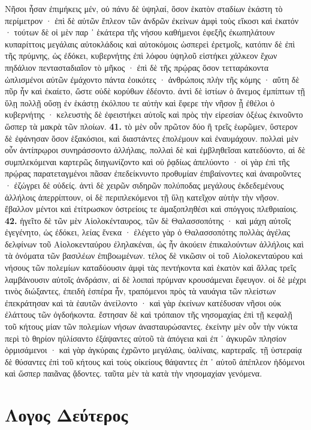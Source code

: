 \documentclass[a4paper, 11pt, oneside, polutonikogreek, german]{article}
\begin{document}
Νῆσοι ἦσαν ἐπιμήκεις μέν, οὐ πάνυ δὲ ὑψηλαί, ὅσον ἑκατὸν σταδίων ἑκάστη τὸ περίμετρον · ἐπὶ δὲ αὐτῶν ἔπλεον τῶν ἀνδρῶν ἐκείνων ἀμφὶ τοὺς εἴκοσι καὶ ἑκατόν · τούτων δὲ οἱ μὲν παρ ᾽ ἑκάτερα τῆς νήσου καθήμενοι ἐφεξῆς ἐκωπηλάτουν κυπαρίττοις μεγάλαις αὐτοκλάδοις καὶ αὐτοκόμοις ὡσπερεὶ ἐρετμοῖς, κατόπιν δὲ ἐπὶ τῆς πρύμνης, ὡς ἐδόκει, κυβερνήτης ἐπὶ λόφου ὑψηλοῦ εἱστήκει χάλκεον ἔχων πηδάλιον πεντασταδιαῖον τὸ μῆκος · ἐπὶ δὲ τῆς πρῴρας ὅσον τετταράκοντα ὡπλισμένοι αὐτῶν ἐμάχοντο πάντα ἐοικότες · ἀνθρώποις πλὴν τῆς κόμης · αὕτη δὲ πῦρ ἦν καὶ ἐκαίετο, ὥστε οὐδὲ κορύθων ἐδέοντο. ἀντὶ δὲ ἱστίων ὁ ἄνεμος ἐμπίπτων τῇ ὕλῃ πολλῇ οὔσῃ ἐν ἑκάστῃ ἐκόλπου τε αὐτὴν καὶ ἔφερε τὴν νῆσον ᾗ ἐθέλοι ὁ κυβερνήτης · κελευστὴς δὲ ἐφειστήκει αὐτοῖς καὶ πρὸς τὴν εἰρεσίαν ὀξέως ἐκινοῦντο ὥσπερ τὰ μακρὰ τῶν πλοίων. \textbf{41.} τὸ μὲν οὖν πρῶτον δύο ἢ τρεῖς ἑωρῶμεν, ὕστερον δὲ ἐφάνησαν ὅσον ἑξακόσιοι, καὶ διαστάντες ἐπολέμουν καὶ ἐναυμάχουν. πολλαὶ μὲν οὖν ἀντίπρῳροι συνηράσσοντο ἀλλήλαις, πολλαὶ δὲ καὶ ἐμβληθεῖσαι κατεδύοντο, αἱ δὲ συμπλεκόμεναι καρτερῶς διηγωνίζοντο καὶ οὐ ῥᾳδίως ἀπελύοντο · οἱ γὰρ ἐπὶ τῆς πρῴρας παρατεταγμένοι πᾶσαν ἐπεδείκνυντο προθυμίαν ἐπιβαίνοντες καὶ ἀναιροῦντες · ἐζώγρει δὲ οὐδείς. ἀντὶ δὲ χειρῶν σιδηρῶν πολύποδας μεγάλους ἐκδεδεμένους ἀλλήλοις ἀπερρίπτουν, οἱ δὲ περιπλεκόμενοι τῇ ὕλῃ κατεῖχον αὐτὴν τὴν νῆσον. ἔβαλλον μέντοι καὶ ἐτίτρωσκον ὀστρείοις τε ἁμαξοπληθέσι καὶ σπόγγοις πλεθριαίοις. \textbf{42.} ἡγεῖτο δὲ τῶν μὲν Αἰολοκένταυρος, τῶν δὲ Θαλασσοπότης · καὶ μάχη αὐτοῖς ἐγεγένητο, ὡς ἐδόκει, λείας ἕνεκα · ἐλέγετο γὰρ ὁ Θαλασσοπότης πολλὰς ἀγέλας δελφίνων τοῦ Αἰολοκενταύρου ἐληλακέναι, ὡς ἦν ἀκούειν ἐπικαλούντων ἀλλήλοις καὶ τὰ ὀνόματα τῶν βασιλέων ἐπιβοωμένων. τέλος δὲ νικῶσιν οἱ τοῦ Αἰολοκενταύρου καὶ νήσους τῶν πολεμίων καταδύουσιν ἀμφὶ τὰς πεντήκοντα καὶ ἑκατὸν καὶ ἄλλας τρεῖς λαμβάνουσιν αὐτοῖς ἀνδράσιν, αἱ δὲ λοιπαὶ πρύμναν κρουσάμεναι ἔφευγον. οἱ δὲ μέχρι τινὸς διώξαντες, ἐπειδὴ ἑσπέρα ἦν, τραπόμενοι πρὸς τὰ ναυάγια τῶν πλείστων ἐπεκράτησαν καὶ τὰ ἑαυτῶν ἀνείλοντο · καὶ γὰρ ἐκείνων κατέδυσαν νῆσοι οὐκ ἐλάττους τῶν ὀγδοήκοντα. ἔστησαν δὲ καὶ τρόπαιον τῆς νησομαχίας ἐπὶ τῇ κεφαλῇ τοῦ κήτους μίαν τῶν πολεμίων νήσων ἀνασταυρώσαντες. ἐκείνην μὲν οὖν τὴν νύκτα περὶ τὸ θηρίον ηὐλίσαντο ἐξάψαντες αὐτοῦ τὰ ἀπόγεια καὶ ἐπ ᾽ ἀγκυρῶν πλησίον ὁρμισάμενοι · καὶ γὰρ ἀγκύραις ἐχρῶντο μεγάλαις, ὑαλίναις, καρτεραῖς. τῇ ὑστεραίᾳ δὲ θύσαντες ἐπὶ τοῦ κήτους καὶ τοὺς οἰκείους θάψαντες ἐπ ᾽ αὐτοῦ ἀπέπλεον ἡδόμενοι καὶ ὥσπερ παιᾶνας ᾄδοντες. ταῦτα μὲν τὰ κατὰ τὴν νησομαχίαν γενόμενα.
\clearpage
\section{Λογος Δεύτερος}
\end{document}
